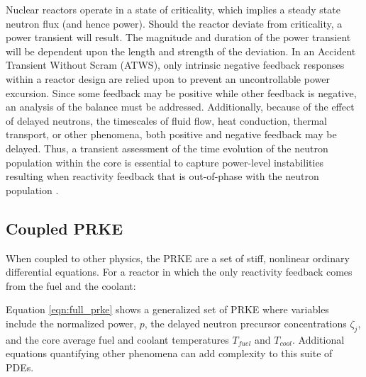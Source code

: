 \documentclass[12pt]{article}
\begin{document}
Nuclear reactors operate in a state of criticality, which implies a steady state
neutron flux (and hence power).  Should the reactor deviate from criticality, a
power transient will result. The magnitude and duration of the power transient
will be dependent upon the length and strength of the deviation.  In an
Accident Transient Without Scram (ATWS), only intrinsic negative feedback 
responses within a reactor design
are relied upon to prevent an uncontrollable power excursion.  Since some
feedback may be positive while other feedback is negative, an analysis of the
balance must be addressed. Additionally, because of the effect of delayed neutrons,
the timescales of fluid flow, heat conduction, thermal transport, or other
phenomena, both positive and negative feedback may be delayed. Thus, a transient
assessment of the time evolution of the neutron population within the core is
essential to capture power-level instabilities resulting when reactivity
feedback that is out-of-phase with the neutron population
\cite{stacey_nuclear_2007}.

\subsection{Coupled PRKE}
When coupled to other physics, the PRKE are a set of stiff, nonlinear ordinary 
differential equations.  For a reactor in which the only reactivity feedback 
comes from the fuel and the coolant:



Equation \ref{eqn:full_prke} shows a generalized set of PRKE where
variables include the normalized power, $p$, the delayed neutron precursor
concentrations $\zeta_j$, and the core average fuel and
coolant temperatures $T_{fuel}$ and $T_{cool}$.  Additional equations
quantifying other phenomena can add complexity to this suite of PDEs.




\end{document}
